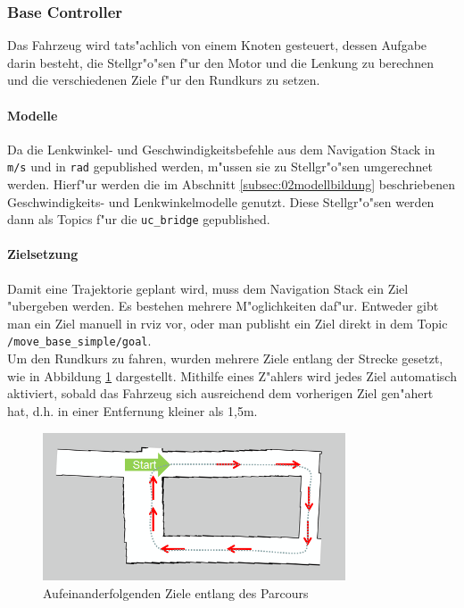 \subsubsection{Base Controller}
\label{subsubsec:02psesTrajectory}

Das Fahrzeug wird tats"achlich von einem Knoten gesteuert, dessen Aufgabe darin besteht, die Stellgr"o"sen f"ur den Motor und die Lenkung zu berechnen und die verschiedenen Ziele f"ur den Rundkurs zu setzen.

\paragraph{Modelle}
Da die Lenkwinkel- und Geschwindigkeitsbefehle aus dem Navigation Stack in \texttt{m/s} und in \texttt{rad} gepublished werden, m"ussen sie zu Stellgr"o"sen umgerechnet werden. Hierf"ur werden die im Abschnitt \ref{subsec:02modellbildung} beschriebenen Geschwindigkeits- und Lenkwinkelmodelle genutzt. Diese Stellgr"o"sen werden dann als Topics f"ur die \texttt{uc\_bridge} gepublished.

\paragraph{Zielsetzung}
Damit eine Trajektorie geplant wird, muss dem Navigation Stack ein Ziel "ubergeben werden. Es bestehen mehrere M"oglichkeiten daf"ur. Entweder gibt man ein Ziel manuell in rviz vor, oder man publisht ein Ziel direkt in dem Topic \texttt{/move\_base\_simple/goal}.\\
Um den Rundkurs zu fahren, wurden mehrere Ziele entlang der Strecke gesetzt, wie in Abbildung \ref{fig:goals} dargestellt. Mithilfe eines Z"ahlers wird jedes Ziel automatisch aktiviert, sobald das Fahrzeug sich ausreichend dem vorherigen Ziel gen"ahert hat, d.h. in einer Entfernung kleiner als 1,5m.

\begin{figure}[H]
	\centering
	\includegraphics[width=0.8\textwidth,trim=2.4cm 0cm 0cm 1cm,clip]{pics/goals.png}
	\caption{Aufeinanderfolgenden Ziele entlang des Parcours}
	\label{fig:goals}
\end{figure}

